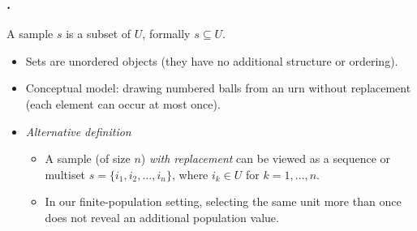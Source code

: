 \documentclass{my_eth_beamer}
\numberwithin{equation}{section}
\begin{document}
\begin{frame}
    \frametitle{\insertsectionnumber.\insertsubsectionnumber~\insertsubsection}

    \begin{Def}[Sample]\label{def:sample}
        \vspace{-0.5em}
        A \alert{sample} $s$ is a \alert{subset} of $U$, formally
        $s \subseteq U$.
    \end{Def}

    \begin{itemize}
    \setlength{\itemsep}{8pt}
        \item Sets are unordered objects (they have no additional
            structure or ordering).
        \item Conceptual model: drawing numbered balls from an urn
            \alert{without replacement} (each element can occur at most once).
        \item \emph{Alternative definition}
            \vspace{0.25em}
            \begin{itemize}
            \setlength{\itemsep}{4pt}
                \item A sample (of size $n$) \emph{with replacement} can be
                    viewed as a \alert{sequence} or \alert{multiset}
                    $s = \{i_1, i_2, \ldots, i_n\}$, where
                    $i_k \in U$ for $k=1, \ldots, n$.
                \item In our finite-population setting, \alert{selecting the
                    same unit} more than once does not reveal an additional
                    population value.
            \end{itemize}
    \end{itemize}
\end{frame}
\end{document}
